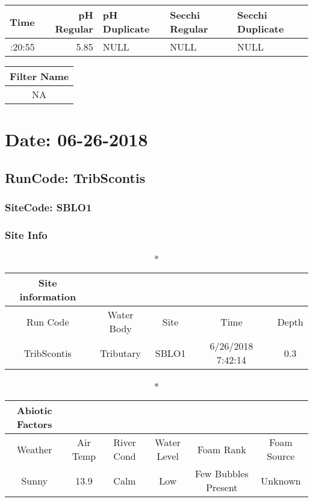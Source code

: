 \documentclass[
  letterpaper,
  DIV=11,
  numbers=noendperiod]{scrartcl}
\begin{document}
\begin{longtable*}{rrlll}
\toprule
Time & pH Regular & pH Duplicate & Secchi Regular & Secchi Duplicate \\ 
\midrule{}:20:55 & 5.85 & NULL & NULL & NULL \\ 
\bottomrule
\end{longtable*}

\begin{longtable*}{c}
\toprule
Filter Name \\ 
\midrule\addlinespace[2.5pt]
NA \\ 
\bottomrule
\end{longtable*}

\hypertarget{date-06-26-2018-3}{%
\section{Date: 06-26-2018}\label{date-06-26-2018-3}}

\hypertarget{runcode-tribscontis-3}{%
\subsection{RunCode: TribScontis}\label{runcode-tribscontis-3}}

\hypertarget{sitecode-sblo1}{%
\subsubsection{SiteCode: SBLO1}\label{sitecode-sblo1}}

\subsubsection{Site Info}

\begin{longtable*}{ccccc}
\caption*{
{\large Site information}
} \\ 
\toprule
Run Code & Water Body & Site & Time & Depth \\ 
\midrule\addlinespace[2.5pt]
TribScontis & Tributary & SBLO1 & 6/26/2018 7:42:14 & 0.3 \\ 
\bottomrule
\end{longtable*}

\begin{longtable*}{cccccc}
\caption*{
{\large Abiotic Factors}
} \\ 
\toprule
Weather & Air Temp & River Cond & Water Level & Foam Rank & Foam Source \\ 
\midrule\addlinespace[2.5pt]
Sunny & 13.9 & Calm & Low & Few Bubbles Present & Unknown \\ 
\bottomrule
\end{longtable*}
\end{document}
